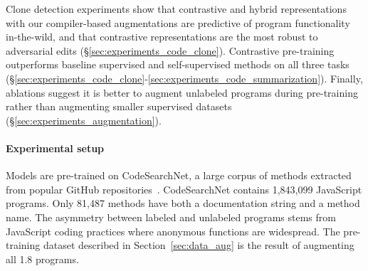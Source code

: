 \documentclass[11pt]{article}
\newcommand{\million}[0]{}
\begin{document}
Clone detection experiments show that contrastive and hybrid representations with our compiler-based augmentations are predictive of program functionality in-the-wild, and that contrastive representations are the most robust to adversarial edits (\S\ref{sec:experiments_code_clone}).
Contrastive pre-training outperforms baseline supervised and self-supervised methods on all three tasks (\S\ref{sec:experiments_code_clone}-\ref{sec:experiments_code_summarization}). Finally, ablations suggest it is better to augment unlabeled programs during pre-training rather than augmenting smaller supervised datasets (\S\ref{sec:experiments_augmentation}).

\paragraph{Experimental setup}
Models are pre-trained on CodeSearchNet, a large corpus of methods extracted from popular GitHub repositories~\citep{husain2019codesearchnet}. CodeSearchNet contains 1,843,099 JavaScript programs. Only 81,487 methods have both a documentation string and a method name. The asymmetry between labeled and unlabeled programs stems from JavaScript coding practices where anonymous functions are widespread. The pre-training dataset described in Section~\ref{sec:data_aug} is the result of augmenting all 1.8\million{} programs.
\end{document}
